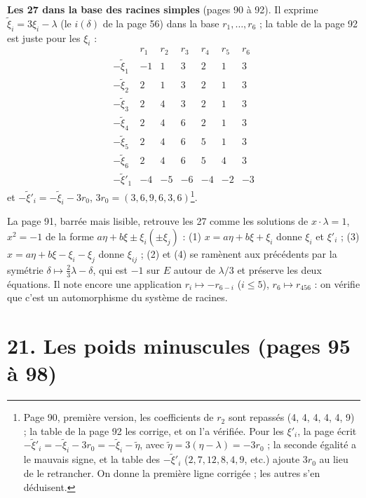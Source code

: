 \documentclass[11pt,a4paper]{article}
\begin{document}
\textbf{Les 27 dans la base des racines simples} (pages 90 à 92). Il exprime
$\widetilde\xi_i = 3\xi_i - \lambda$ (le $i(\delta)$ de la page 56) dans la
base $r_1, \ldots, r_6$ ; la table de la page 92 est juste pour les $\xi_i$ :
\[
\begin{array}{c|cccccc}
& r_1 & r_2 & r_3 & r_4 & r_5 & r_6 \\ \hline
-\widetilde\xi_1 & -1 & 1 & 3 & 2 & 1 & 3 \\
-\widetilde\xi_2 & 2 & 1 & 3 & 2 & 1 & 3 \\
-\widetilde\xi_3 & 2 & 4 & 3 & 2 & 1 & 3 \\
-\widetilde\xi_4 & 2 & 4 & 6 & 2 & 1 & 3 \\
-\widetilde\xi_5 & 2 & 4 & 6 & 5 & 1 & 3 \\
-\widetilde\xi_6 & 2 & 4 & 6 & 5 & 4 & 3 \\ \hline
-\widetilde\xi'_1 & -4 & -5 & -6 & -4 & -2 & -3
\end{array}
\]
et $-\widetilde\xi'_i = -\widetilde\xi_i - 3r_0$, $3r_0 = (3, 6, 9, 6, 3,
6)$\footnote{Page 90, première version, les coefficients de $r_2$ sont repassés
(4, 4, 4, 4, 4, 9) ; la table de la page 92 les corrige, et on l'a vérifiée.
Pour les $\xi'_i$, la page écrit $-\widetilde\xi'_i = -\widetilde\xi_i - 3r_0
= -\widetilde\xi_i - \widetilde\eta$, avec $\widetilde\eta = 3(\eta - \lambda)
= -3r_0$ ; la seconde égalité a le mauvais signe, et la table des
$-\widetilde\xi'_i$ ($2, 7, 12, 8, 4, 9$, etc.) ajoute $3r_0$ au lieu de le
retrancher. On donne la première ligne corrigée ; les autres s'en déduisent.}.

La page 91, barrée mais lisible, retrouve les 27 comme les solutions de $x
\cdot \lambda = 1$, $x^2 = -1$ de la forme $a\eta + b\xi \pm \xi_i (\pm \xi_j)$
: (1) $x = a\eta + b\xi + \xi_i$ donne $\xi_i$ et $\xi'_i$ ; (3) $x = a\eta +
b\xi - \xi_i - \xi_j$ donne $\xi_{ij}$ ; (2) et (4) se ramènent aux précédents
par la symétrie $\delta \mapsto \tfrac23 \lambda - \delta$, qui est $-1$ sur
$E$ autour de $\lambda/3$ et préserve les deux équations. Il note encore une
application $r_i \mapsto -r_{6-i}$ ($i \leq 5$), $r_6 \mapsto r_{456}$ : on
vérifie que c'est un automorphisme du système de racines.

\section*{21. Les poids minuscules (pages 95 à 98)}
\end{document}
